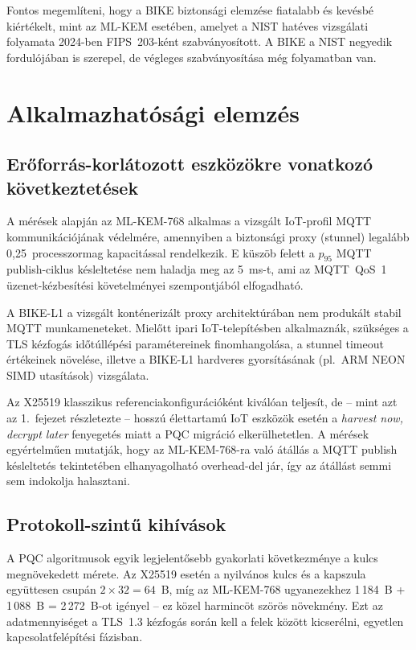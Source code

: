 Fontos megemlíteni, hogy a BIKE biztonsági elemzése fiatalabb és kevésbé kiértékelt, mint az
ML-KEM esetében, amelyet a NIST hatéves vizsgálati folyamata 2024-ben FIPS~203-ként
szabványosított. A BIKE a NIST negyedik fordulójában is szerepel, de végleges szabványosítása
még folyamatban van.

\section{Alkalmazhatósági elemzés}

\subsection{Erőforrás-korlátozott eszközökre vonatkozó következtetések}

A mérések alapján az ML-KEM-768 alkalmas a vizsgált IoT-profil MQTT kommunikációjának
védelmére, amennyiben a biztonsági proxy (stunnel) legalább 0,25~processzormag kapacitással
rendelkezik. E küszöb felett a $p_{95}$ MQTT publish-ciklus késleltetése nem haladja meg
az 5~ms-t, ami az MQTT~QoS~1 üzenet-kézbesítési követelményei szempontjából elfogadható.

A BIKE-L1 a vizsgált konténerizált proxy architektúrában nem produkált stabil MQTT
munkameneteket. Mielőtt ipari IoT-telepítésben alkalmaznák, szükséges a TLS kézfogás
időtúllépési paramétereinek finomhangolása, a stunnel timeout értékeinek növelése, illetve
a BIKE-L1 hardveres gyorsításának (pl.\ ARM NEON SIMD utasítások) vizsgálata.

Az X25519 klasszikus referenciakonfigurációként kiválóan teljesít, de -- mint azt az
1.\ fejezet részletezte -- hosszú élettartamú IoT eszközök esetén a \emph{harvest now,
decrypt later} fenyegetés miatt a PQC migráció elkerülhetetlen. A mérések egyértelműen
mutatják, hogy az ML-KEM-768-ra való átállás a MQTT publish késleltetés tekintetében
elhanyagolható overhead-del jár, így az átállást semmi sem indokolja halasztani.

\subsection{Protokoll-szintű kihívások}

A PQC algoritmusok egyik legjelentősebb gyakorlati következménye a kulcs megnövekedett
mérete. Az X25519 esetén a nyilvános kulcs és a kapszula együttesen csupán $2 \times 32 = 64$~B,
míg az ML-KEM-768 ugyanezekhez 1\,184~B + 1\,088~B = 2\,272~B-ot igényel -- ez
közel harmincöt szörös növekmény. Ezt az adatmennyiséget a TLS~1.3 kézfogás során kell
a felek között kicserélni, egyetlen kapcsolatfelépítési fázisban.

